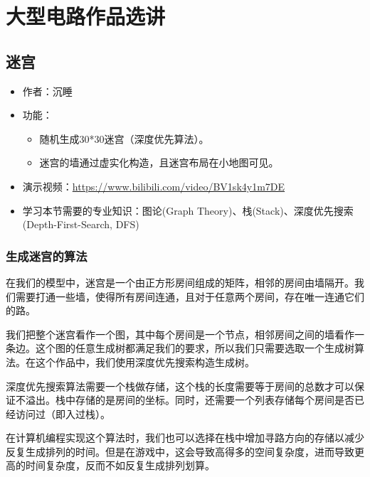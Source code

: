 \chapter{大型电路作品选讲}

\section{迷宫}

\begin{itemize}
	\item 作者：沉睡
	\item 功能：
	\begin{itemize}
		\item 随机生成30*30迷宫（深度优先算法）。
		\item 迷宫的墙通过虚实化构造，且迷宫布局在小地图可见。
	\end{itemize}
	\item 演示视频：\url{https://www.bilibili.com/video/BV1sk4y1m7DE}
	\item 学习本节需要的专业知识：图论(Graph Theory)、栈(Stack)、深度优先搜索(Depth-First-Search, DFS)
\end{itemize}

\subsection{生成迷宫的算法}
在我们的模型中，迷宫是一个由正方形房间组成的矩阵，相邻的房间由墙隔开。我们需要打通一些墙，使得所有房间连通，且对于任意两个房间，存在唯一连通它们的路。

我们把整个迷宫看作一个图，其中每个房间是一个节点，相邻房间之间的墙看作一条边。这个图的任意生成树都满足我们的要求，所以我们只需要选取一个生成树算法。在这个作品中，我们使用深度优先搜索构造生成树。

深度优先搜索算法需要一个栈做存储，这个栈的长度需要等于房间的总数才可以保证不溢出。栈中存储的是房间的坐标。同时，还需要一个列表存储每个房间是否已经访问过（即入过栈）。

\begin{remark}
在计算机编程实现这个算法时，我们也可以选择在栈中增加寻路方向的存储以减少反复生成排列的时间。但是在游戏中，这会导致高得多的空间复杂度，进而导致更高的时间复杂度，反而不如反复生成排列划算。
\end{remark}

